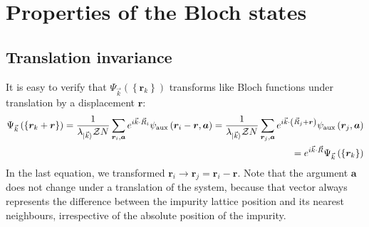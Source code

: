\section{Properties of the Bloch states}\label{BlochProperties}

\subsection{Translation invariance}
It is easy to verify that \(\Psi_{\vec k}\left(\left\{ {\bm r}_k \right\}  \right) \) transforms like Bloch functions under translation by a displacement \({\bm r}\):
\begin{equation}\begin{aligned}
	\Psi_{\vec k}\left(\left\{{\bm r}_k + {\bm r}\right\} \right) = \frac{1}{\lambda_{\ket{\vec k}} \mathcal{Z} N}\sum_{{\bm r}_i,{\bm a}} e^{i \vec{k}\cdot\vec{R}_i} \psi_\text{aux}\left({\bm r}_i - {\bm r}, {\bm a}\right) = \frac{1}{\lambda_{\ket{\vec k}} \mathcal{Z} N}\sum_{{\bm r}_j, {\bm a}} e^{i \vec{k}\cdot\left(\vec{R}_j + {\bm r}\right)} \psi_\text{aux}\left({\bm r}_j, {\bm a}\right) \\
	= e^{i \vec{k}\cdot\vec{R}} \Psi_{\vec k}\left(\left\{ {\bm r}_k \right\} \right)
\end{aligned}\end{equation}
In the last equation, we transformed \({\bm r}_i \to {\bm r}_j = {\bm r}_i - {\bm r}\). Note that the argument \({\bm a}\) does not change under a translation of the system, because that vector always represents the difference between the impurity lattice position and its nearest neighbours, irrespective of the absolute position of the impurity.

